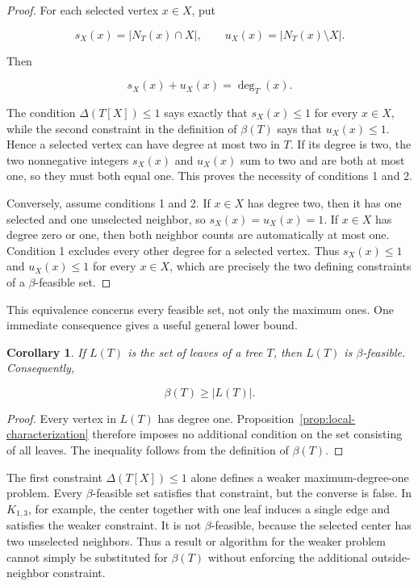 \documentclass[11pt,a4paper]{article}
\newtheorem{corollary}[theorem]{Corollary}
\numberwithin{equation}{section}
\begin{document}
\begin{proof}
For each selected vertex \(x\in X\), put

\[
s_X(x)=|N_T(x)\cap X|,
\qquad
u_X(x)=|N_T(x)\setminus X|.
\]

Then

\[
s_X(x)+u_X(x)=\deg_T(x).
\]

The condition \(\Delta(T[X])\le 1\) says exactly that \(s_X(x)\le 1\)
for every \(x\in X\), while the second constraint in the definition of
\(\beta(T)\) says that \(u_X(x)\le 1\). Hence a selected vertex can have
degree at most two in \(T\). If its degree is two, the two nonnegative
integers \(s_X(x)\) and \(u_X(x)\) sum to two and are both at most one,
so they must both equal one. This proves the necessity of conditions 1
and 2.

Conversely, assume conditions 1 and 2. If \(x\in X\) has degree two,
then it has one selected and one unselected neighbor, so
\(s_X(x)=u_X(x)=1\). If \(x\in X\) has degree zero or one, then both
neighbor counts are automatically at most one. Condition 1 excludes
every other degree for a selected vertex. Thus \(s_X(x)\le 1\) and
\(u_X(x)\le 1\) for every \(x\in X\), which are precisely the two
defining constraints of a \(\beta\)-feasible set.
\end{proof}

This equivalence concerns every feasible set, not only the maximum ones.
One immediate consequence gives a useful general lower bound.

\begin{corollary}\label{cor:leaves}
If \(L(T)\) is the set of leaves of a tree
\(T\), then \(L(T)\) is \(\beta\)-feasible. Consequently,

\[
\beta(T)\ge |L(T)|.
\]
\end{corollary}

\begin{proof}
Every vertex in \(L(T)\) has degree one. Proposition~\ref{prop:local-characterization}
therefore imposes no additional condition on the set consisting of all
leaves. The inequality follows from the definition of \(\beta(T)\).
\end{proof}

The first constraint \(\Delta(T[X])\le 1\) alone defines a weaker
maximum-degree-one problem. Every \(\beta\)-feasible set satisfies that
constraint, but the converse is false. In \(K_{1,3}\), for example, the
center together with one leaf induces a single edge and satisfies the
weaker constraint. It is not \(\beta\)-feasible, because the selected
center has two unselected neighbors. Thus a result or algorithm for the
weaker problem cannot simply be substituted for \(\beta(T)\) without
enforcing the additional outside-neighbor constraint.
\end{document}
